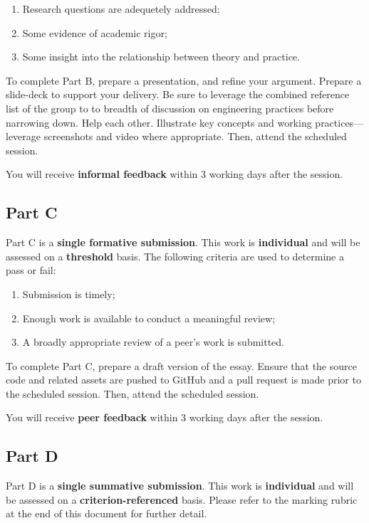 \documentclass{../../fal_assignment}
\begin{document}
\begin{enumerate}[label=(\alph*)]
	\item Research questions are adequetely addressed;
	\item Some evidence of academic rigor;
	\item Some insight into the relationship between theory and practice.
\end{enumerate}

To complete Part B, prepare a presentation, and refine your argument. Prepare a slide-deck to support your delivery. Be sure to leverage the combined reference list of the group to to breadth of discussion on engineering practices before narrowing down. Help each other. Illustrate key concepts and working practices---leverage screenshots and video where appropriate. Then, attend the scheduled session.

You will receive \textbf{informal feedback} within 3 working days after the session.

\subsection*{Part C}

Part C is a \textbf{single formative submission}. This work is \textbf{individual} and will be assessed on a \textbf{threshold} basis. The following criteria are used to determine a pass or fail:

\begin{enumerate}[label=(\alph*)]
	\item Submission is timely;
	\item Enough work is available to conduct a meaningful review;
	\item A broadly appropriate review of a peer's work is submitted.
\end{enumerate}

To complete Part C, prepare a draft version of the essay. Ensure that the source code and related assets are pushed to GitHub and a pull request is made prior to the scheduled session. Then, attend the scheduled session.

You will receive \textbf{peer feedback} within 3 working days after the session.

\subsection*{Part D}

Part D is a \textbf{single summative submission}. This work is \textbf{individual} and will be assessed on a \textbf{criterion-referenced} basis. Please refer to the marking rubric at the end of this document for further detail.
\end{document}
